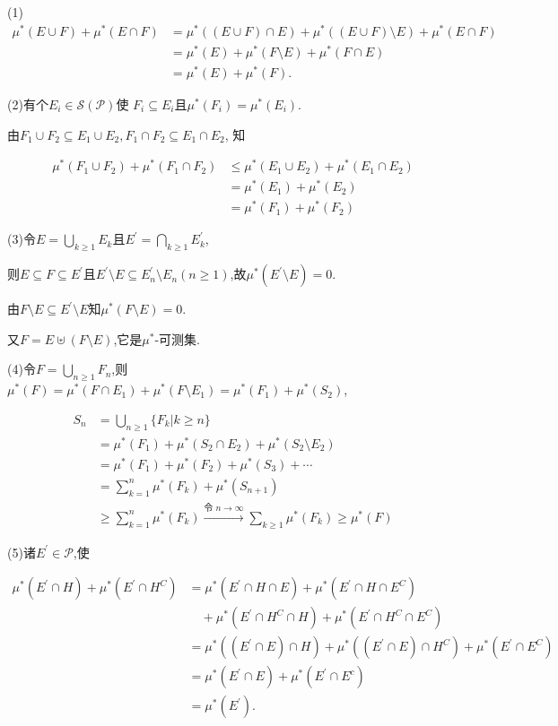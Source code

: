 \begin{solution}
(1)
\begin{align*}
    \mu^{*}(E\cup F)+\mu^{*}(E\cap F)&=\mu^{*}((E\cup F)\cap E)+\mu^{*}((E\cup F)\setminus E)+\mu^*(E\cap F)\\
    &=\mu^{*}(E)+\mu^{*}(F\setminus E)+\mu^{*}(F\cap E)\\
    &=\mu^{*}(E)+\mu^{*}(F).
\end{align*}

(2)有个$E_i\in \mathcal{S}(\mathcal{P})$使 $F_i\subseteq E_i$且$\mu^{* }( F_{i}) = \mu^{* }( E_{i})$.

由$F_1\cup F_2\subseteq E_1\cup E_2,F_1\cap F_2\subseteq E_1\cap E_2$, 知

\begin{align*}
    \mu^*(F_{1}\cup F_{2})+\mu^*(F_{1}\cap F_{2})&\leqslant \mu^*(E_{1}\cup E_{2})+\mu^*(E_{1}\cap E_{2})\\
    &=\mu^*(E_{1})+\mu^*(E_{2})\\
    &=\mu^*(F_{1})+\mu^*(F_{2})
\end{align*}

(3)令$E=\bigcup\limits_{k\geqslant1}E_k$且$E^{\prime}=\bigcap\limits_{k\geqslant1}E^{\prime}_k$,

则$E\subseteq F\subseteq E^{\prime}$且$E^{\prime}\setminus E\subseteq E_n^{\prime}\setminus E_n(n\geqslant1)$,故$\mu^*(E^\prime\setminus E)=0$.

由$F\setminus E\subseteq E^{\prime}\setminus E$知$\mu^*(F\setminus E)=0.$

又$F=E\uplus(F\setminus E)$,它是$\mu^*$-可测集.

(4)令$F=\bigcup\limits_{n\geqslant1}F_{n}$,则$\mu^{*}(F)=\mu^{*}(F\cap E_{1})+\mu^{*}(F\setminus E_{1})=\mu^{*}(F_{1})+\mu^{*}(S_{2})$,

\begin{align*}
    S_n&=\bigcup_{n\geqslant1}\{F_k|k\geqslant n\}\\
    &=\mu^*(F_{1})+\mu^*(S_{2}\cap E_{2})+\mu^*(S_{2}\setminus E_2)\\
    &=\mu^*(F_{1})+\mu^*(F_{2})+\mu^*(S_{3})+\cdots\\
    &=\sum_{k=1}^n\mu^{*}(F_{k})+\mu^{*}(S_{n+1})\\
    &\geqslant\sum_{k=1}^n\mu^{*}(F_{k})\xrightarrow{\text{令 }n\to\infty}
    \sum_{k\geqslant1}\mu^{*}(F_{k})\geqslant\mu^{*}(F)
\end{align*}

(5)诸$E^{\prime}\in\mathcal{P}$,使

\begin{align*}
    \mu^{*}(E^{\prime}\cap H)+\mu^{*}(E^{\prime}\cap H^{C})&=\mu^{*}(E^{\prime}\cap H\cap E)+\mu^{*}(E^{\prime}\cap H\cap E^{C})\\
    &\quad+\mu^{*}(E^{\prime}\cap H^C\cap H)+\mu^{*}(E^{\prime}\cap H^C\cap E^{C})\\
    &=\mu^{*}((E^{\prime}\cap E)\cap H)+\mu^{*}((E^{\prime}\cap E)\cap H^{C})+\mu^*(E^{\prime}\cap E^{C})\\
    &=\mu^{*}(E^{\prime}\cap E)+\mu^{*}(E^{\prime}\cap E^{c})\\
    &=\mu^{*}(E^{\prime}).
\end{align*}


\end{solution}
